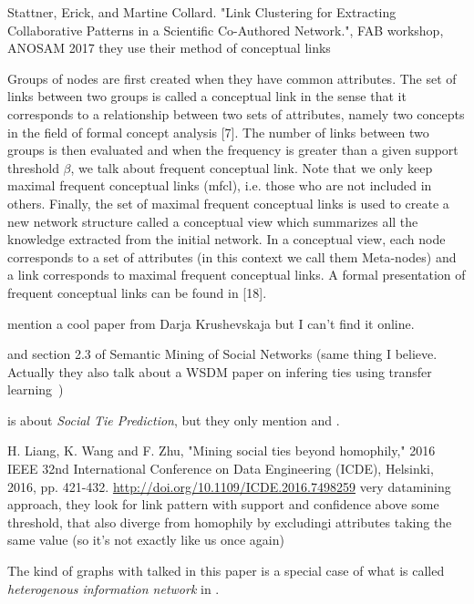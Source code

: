 Stattner, Erick, and Martine Collard. "Link Clustering for Extracting Collaborative Patterns in a Scientific Co-Authored Network.", FAB workshop, ANOSAM 2017
they use their method of conceptual links

Groups of nodes are first created when they have common attributes. The set of links between two
groups is called a conceptual link in the sense that it corresponds to a relationship between two
sets of attributes, namely two concepts in the field of formal concept analysis [7]. The number of
links between two groups is then evaluated and when the frequency is greater than a given support
threshold $\beta$, we talk about frequent conceptual link. Note that we only keep maximal frequent conceptual links (mfcl), i.e. those who are not included in others.
Finally, the set of maximal frequent conceptual links is used to create a new network structure called a conceptual view which summarizes all the knowledge extracted from the initial network. In a conceptual view, each node corresponds to a set of attributes (in this context we call them Meta-nodes) and a link corresponds to maximal frequent conceptual links.
A formal presentation of frequent conceptual links can be found in [18].

\Textcite[section 7.2 edge labelling]{nodeClassif11} mention a cool paper from Darja Krushevskaja
but I can't find it online.

 and 
section 2.3 of Semantic Mining of Social Networks (same thing I believe.
Actually they also talk about a WSDM paper on infering ties using transfer
learning~\autocite{transferTiesPred16})

\Textcite[Section 4.2.2]{miningSocialTheoriesSurvey14} is about \emph{Social Tie
Prediction}, but they only mention \autocite{transferTiesPred16} and
\autocite{Yang2012}.

H. Liang, K. Wang and F. Zhu, "Mining social ties beyond homophily," 2016 IEEE 32nd International Conference on Data Engineering (ICDE), Helsinki, 2016, pp. 421-432.
\url{http://doi.org/10.1109/ICDE.2016.7498259} very datamining approach, they
look for link pattern with support and confidence above some threshold, that
also diverge from homophily by excludingi attributes taking the same value (so
it's not exactly like us once again)

The kind of graphs with talked in this paper is a special case of what is
called \emph{heterogenous information network} in \autocite{HINSurvey17}.
